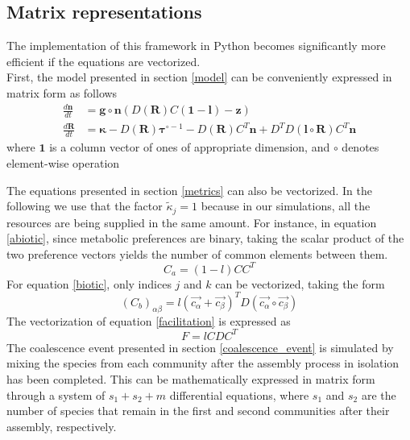 \documentclass[12pt]{article}
\begin{document}
	    \subsection{Matrix representations}\label{matrix_representations}
	    
        	The implementation of this framework in Python becomes significantly more efficient if the equations are vectorized.\\
        	First, the model presented in section \ref{model} can be conveniently expressed in matrix form  as follows
        	\begin{equation}
        		\begin{aligned}
        		\frac{d\boldsymbol{n}}{dt} &= \boldsymbol{g}\circ \boldsymbol{n}\left(D(\boldsymbol{R})C(\boldsymbol{1}-\boldsymbol{l}) - \boldsymbol{z}\right)\\
        		\frac{d\boldsymbol{R}}{dt} &= \boldsymbol{\kappa} - D(\boldsymbol{R})\boldsymbol{\tau}^{\circ -1}- D(\boldsymbol{R})C^T\boldsymbol{n} + D^TD(\boldsymbol{l}\circ \boldsymbol{R})C^T\boldsymbol{n}
        		\end{aligned}
        	\end{equation}
        	where $\boldsymbol{1}$ is a column vector of ones of appropriate dimension, and $ \circ $ denotes element-wise operation\par
        	The equations presented in section \ref{metrics} can also be vectorized. In the following we use that the factor $\tilde{\kappa}_j = 1$ because in our simulations, all the resources are being supplied in the same amount. For instance, in equation \ref{abiotic}, since metabolic preferences are binary, taking the scalar product of the two preference vectors yields the number of common elements between them.
        	\begin{equation}
        	    	C_a = (1-l) CC^T
        	\end{equation}
        	For equation \ref{biotic}, only indices $j$ and $k$ can be vectorized, taking the form
        	\begin{equation}
        	    (C_b)_{\alpha \beta} = l \left(\vec{c_{\alpha}} + \vec{c_{\beta}}\right)^T D \left(\vec{c_{\alpha}}\circ \vec{c_{\beta}}\right)
        	\end{equation}
        	The vectorization of equation \ref{facilitation} is expressed as
        	\begin{equation}
        	    F = l C D C^T
        	\end{equation}
            The coalescence event presented in section \ref{coalescence_event} is simulated by mixing the species from each community after the assembly process in isolation has been completed. This can be mathematically expressed in matrix form through a system of $ s_1 + s_2 + m $ differential equations, where $ s_1 $ and $ s_2 $ are the number of species that remain in the first and second communities after their assembly, respectively. 
\end{document}

